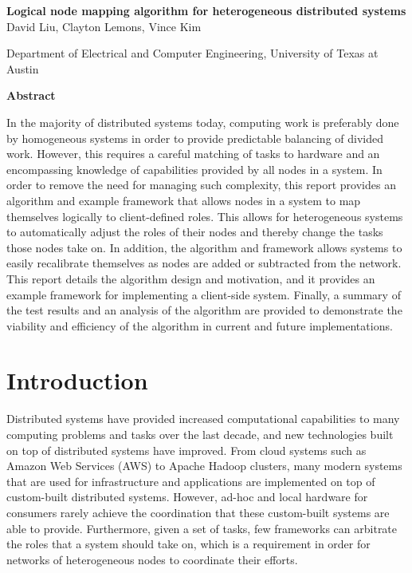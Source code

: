 \documentclass[11pt]{article}
\begin{document}
\newpage
\begin{center}
{\Large \textbf{Logical node mapping algorithm for heterogeneous distributed systems}}\\[1.0cm]
David Liu, Clayton Lemons, Vince Kim

\vspace{.1 in}
Department of Electrical and Computer Engineering, University of Texas at Austin

\vspace{.1 in}
\end{center}
\begin{multicols}{2}
\begin{center}

\textbf{Abstract}
\end{center}
In the majority of distributed systems today, computing work is preferably done by homogeneous systems in order to provide predictable balancing of divided work. However, this requires a careful matching of tasks to hardware and an encompassing knowledge of capabilities provided by all nodes in a system. In order to remove the need for managing such complexity, this report provides an algorithm and example framework that allows nodes in a system to map themselves logically to client-defined roles. This allows for heterogeneous systems to automatically adjust the roles of their nodes and thereby change the tasks those nodes take on. In addition, the algorithm and framework allows systems to easily recalibrate themselves as nodes are added or subtracted from the network. This report details the algorithm design and motivation, and it provides an example framework for implementing a client-side system. Finally, a summary of the test results and an analysis of the algorithm are provided to demonstrate the viability and efficiency of the algorithm in current and future implementations.

\section{Introduction}
Distributed systems have provided increased computational capabilities to many computing problems and tasks over the last decade, and new technologies built on top of distributed systems have improved. From cloud systems such as Amazon Web Services (AWS) to Apache Hadoop clusters, many modern systems that are used for infrastructure and applications are implemented on top of custom-built distributed systems. However, ad-hoc and local hardware for consumers rarely achieve the coordination that these custom-built systems are able to provide.  Furthermore, given a set of tasks, few frameworks can arbitrate the roles that a system should take on, which is a requirement in order for networks of heterogeneous nodes to coordinate their efforts.


\end{multicols}
\end{document}
